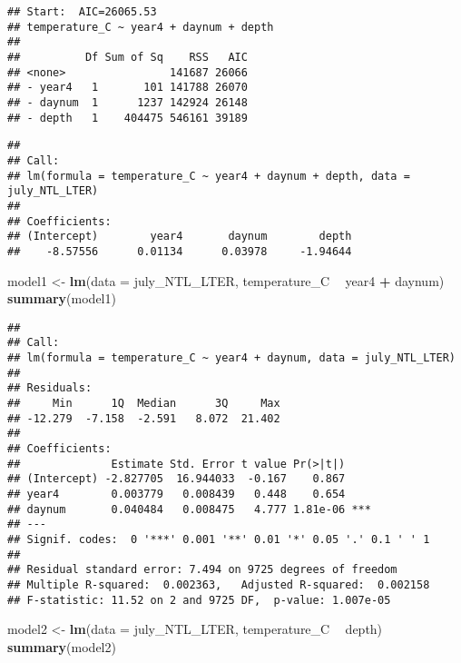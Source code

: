 \documentclass[]{article}
\newenvironment{Shaded}{\begin{snugshade}}{\end{snugshade}}
\newcommand{\KeywordTok}[1]{\textcolor[rgb]{0.13,0.29,0.53}{\textbf{#1}}}
\newcommand{\DataTypeTok}[1]{\textcolor[rgb]{0.13,0.29,0.53}{#1}}
\newcommand{\StringTok}[1]{\textcolor[rgb]{0.31,0.60,0.02}{#1}}
\newcommand{\OperatorTok}[1]{\textcolor[rgb]{0.81,0.36,0.00}{\textbf{#1}}}
\newcommand{\NormalTok}[1]{#1}
\begin{document}
\begin{verbatim}
## Start:  AIC=26065.53
## temperature_C ~ year4 + daynum + depth
## 
##          Df Sum of Sq    RSS   AIC
## <none>                141687 26066
## - year4   1       101 141788 26070
## - daynum  1      1237 142924 26148
## - depth   1    404475 546161 39189
\end{verbatim}

\begin{verbatim}
## 
## Call:
## lm(formula = temperature_C ~ year4 + daynum + depth, data = july_NTL_LTER)
## 
## Coefficients:
## (Intercept)        year4       daynum        depth  
##    -8.57556      0.01134      0.03978     -1.94644
\end{verbatim}

\begin{Shaded}
\begin{Highlighting}[]
\NormalTok{model1 <-}\StringTok{ }\KeywordTok{lm}\NormalTok{(}\DataTypeTok{data =}\NormalTok{ july_NTL_LTER, temperature_C }\OperatorTok{~}\StringTok{ }\NormalTok{year4 }\OperatorTok{+}\StringTok{ }\NormalTok{daynum)}
\KeywordTok{summary}\NormalTok{(model1)}
\end{Highlighting}
\end{Shaded}

\begin{verbatim}
## 
## Call:
## lm(formula = temperature_C ~ year4 + daynum, data = july_NTL_LTER)
## 
## Residuals:
##     Min      1Q  Median      3Q     Max 
## -12.279  -7.158  -2.591   8.072  21.402 
## 
## Coefficients:
##              Estimate Std. Error t value Pr(>|t|)    
## (Intercept) -2.827705  16.944033  -0.167    0.867    
## year4        0.003779   0.008439   0.448    0.654    
## daynum       0.040484   0.008475   4.777 1.81e-06 ***
## ---
## Signif. codes:  0 '***' 0.001 '**' 0.01 '*' 0.05 '.' 0.1 ' ' 1
## 
## Residual standard error: 7.494 on 9725 degrees of freedom
## Multiple R-squared:  0.002363,   Adjusted R-squared:  0.002158 
## F-statistic: 11.52 on 2 and 9725 DF,  p-value: 1.007e-05
\end{verbatim}

\begin{Shaded}
\begin{Highlighting}[]
\NormalTok{model2 <-}\StringTok{ }\KeywordTok{lm}\NormalTok{(}\DataTypeTok{data =}\NormalTok{ july_NTL_LTER, temperature_C }\OperatorTok{~}\StringTok{ }\NormalTok{depth)}
\KeywordTok{summary}\NormalTok{(model2)}
\end{Highlighting}
\end{Shaded}
\end{document}
